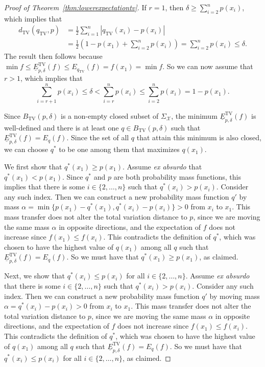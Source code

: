 \documentclass{article}
\begin{document}
\begin{proof}[Proof of Theorem~\ref{thm:lowerexpectationtv}]
If $r=1$, then $\delta\geq\sum_{i=2}^n p(x_i)$, which implies that
\begin{align*}
d_{\mathrm{TV}}(q_\mathrm{TV},p)
&=\frac{1}{2}\sum_{i=1}^n|q_\mathrm{TV}(x_i)-p(x_i)|\\
&=\frac{1}{2}\left(1-p(x_1)+\sum_{i=2}^n p(x_i)\right)
=\sum_{i=2}^n p(x_i)\leq\delta.
\end{align*}
The result then follows because $\min f\leq\underline{E}^\mathrm{TV}_{p,\delta}(f)\leq E_{q_\mathrm{TV}}(f)=f(x_1)=\min f$. So we can now assume that $r>1$, which implies that 
\begin{equation*}
\sum_{i=r+1}^n p(x_i)\leq\delta<\sum_{i=r}^{n} p(x_i)\leq\sum_{i=2}^n p(x_i)=1-p(x_1).
\end{equation*}

Since $B_\mathrm{TV}(p,\delta)$ is a non-empty closed subset of $\Sigma_\mathcal{X}$, the minimum $\underline{E}^\mathrm{TV}_{p,\delta}(f)$ is well-defined and there is at least one $q\in B_\mathrm{TV}(p,\delta)$ such that $\underline{E}^\mathrm{TV}_{p,\delta}(f)=E_q(f)$. Since the set of all $q$ that attain this minimum is also closed, we can choose $q^*$ to be one among them that maximizes $q(x_1)$.


We first show that $q^*(x_1)\geq p(x_1)$. Assume \emph{ex absurdo} that $q^*(x_1)<p(x_1)$. Since $q^*$ and $p$ are both probability mass functions, this implies that there is some $i\in\{2,\ldots,n\}$ such that $q^*(x_i)>p(x_i)$. Consider any such index. Then we can construct a new probability mass function $q'$ by mass $\alpha=\min\{p(x_1)-q^*(x_1),q^*(x_{i})-p(x_{i})\}>0$ from $x_{i}$ to $x_1$. This mass transfer does not alter the total variation distance to $p$, since we are moving the same mass $\alpha$ in opposite directions, and the expectation of $f$ does not increase since $f(x_1)\leq f(x_i)$. This contradicts the definition of $q^*$, which was chosen to have the highest value of $q(x_1)$ among all $q$ such that $\underline{E}^\mathrm{TV}_{p,\delta}(f)=E_q(f)$. So we must have that $q^*(x_1)\geq p(x_1)$, as claimed.

Next, we show that $q^*(x_i)\leq p(x_i)$ for all $i\in\{2,\ldots,n\}$. Assume \emph{ex absurdo} that there is some $i\in\{2,\ldots,n\}$ such that $q^*(x_i)>p(x_i)$. Consider any such index. Then we can construct a new probability mass function $q'$ by moving mass $\alpha=q^*(x_i)-p(x_i)>0$ from $x_i$ to $x_1$. This mass transfer does not alter the total variation distance to $p$, since we are moving the same mass $\alpha$ in opposite directions, and the expectation of $f$ does not increase since $f(x_1)\leq f(x_i)$. This contradicts the definition of $q^*$, which was chosen to have the highest value of $q(x_1)$ among all $q$ such that $\underline{E}^\mathrm{TV}_{p,\delta}(f)=E_q(f)$. So we must have that $q^*(x_i)\leq p(x_i)$ for all $i\in\{2,\ldots,n\}$, as claimed.


\end{proof}
\end{document}

